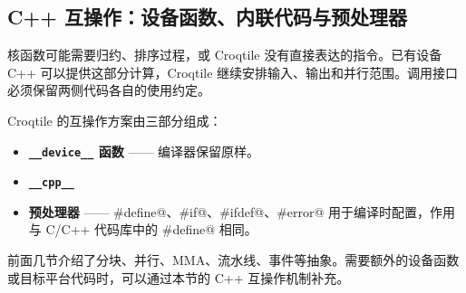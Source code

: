 \subsection*{C++ 互操作：设备函数、内联代码与预处理器}

核函数可能需要归约、排序过程，或 Croqtile 没有直接表达的指令。已有设备 C++ 可以提供这部分计算，Croqtile 继续安排输入、输出和并行范围。调用接口必须保留两侧代码各自的使用约定。

Croqtile 的互操作方案由三部分组成：

\begin{itemize}[leftmargin=1.6em]
\item \textbf{\texttt{\_\_device\_\_} 函数} —— 编译器保留原样。
\item \textbf{\texttt{\_\_cpp\_\_}}
\item \textbf{预处理器} —— \co@#define@、\co@#if@、\co@#ifdef@、\co@#error@ 用于编译时配置，作用与 C/C++ 代码库中的 \co@#define@ 相同。
\end{itemize}

前面几节介绍了分块、并行、MMA、流水线、事件等抽象。需要额外的设备函数或目标平台代码时，可以通过本节的 C++ 互操作机制补充。
